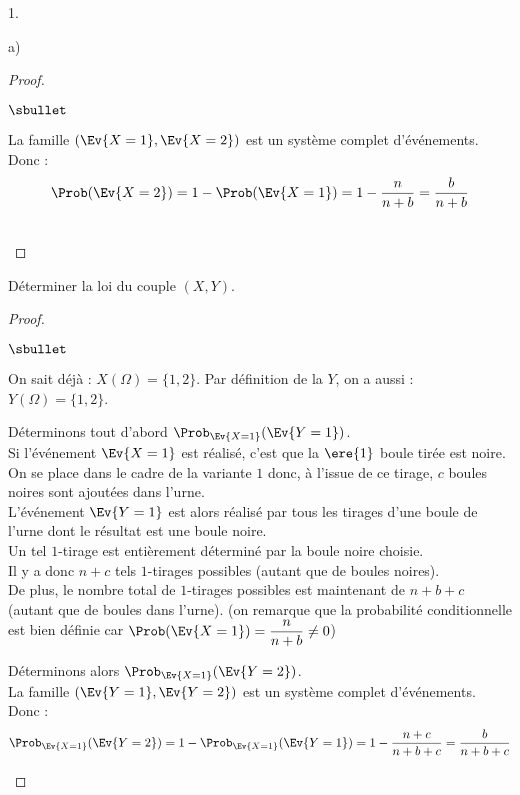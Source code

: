 \documentclass[11pt]{article}%
\begin{document}
\begin{noliste}{1.}
\begin{noliste}{a)}
\begin{proof}
\begin{noliste}{$\sbullet$}
  \item La famille $(\Ev{X=1}, \Ev{X=2})$ est un système complet 
  d'événements. Donc :
  \[
   \Prob(\Ev{X=2})=1-\Prob(\Ev{X=1}) = 1-\dfrac{n}{n+b} =
   \dfrac{b}{n+b}
  \]
 \end{noliste}
 ~\\[-1cm]
\end{proof}



\item Déterminer la loi du couple $(X,Y)$.

\begin{proof}~
  \begin{noliste}{$\sbullet$}
  \item On sait déjà : $X(\Omega)=\{1,2\}$. Par définition de la \var
    $Y$, on a aussi : $Y(\Omega)=\{1,2\}$.
  
  \item Déterminons tout d'abord $\Prob_{\Ev{X=1}}(\Ev{Y = 1})$.\\[.2cm]
    Si l'événement $\Ev{X=1}$ est réalisé, c'est que la $\ere{1}$
    boule tirée est noire. On se place dans le cadre de la variante
    $1$ donc, à l'issue de ce tirage, $c$ boules noires sont ajoutées
    dans l'urne.\\
    L'événement $\Ev{Y=1}$ est alors réalisé par tous les tirages
    d'une boule de l'urne dont le résultat est une boule noire.\\
    Un tel $1$-tirage est entièrement déterminé par la boule noire
    choisie.\\
    Il y a donc $n + c$ tels $1$-tirages possibles (autant que de
    boules noires).\\
    De plus, le nombre total de $1$-tirages possibles est maintenant
    de $n+b+c$ (autant que de boules dans l'urne). %
    (on remarque que la probabilité conditionnelle est bien définie
    car $\Prob(\Ev{X=1})=\dfrac{n}{n+b} \neq 0$)
    
  \item Déterminons alors $\Prob_{\Ev{X=1}}(\Ev{Y = 2})$.\\
    La famille $(\Ev{Y=1}, \Ev{Y=2})$ est un système complet
    d'événements. Donc :
    \[
    \Prob_{\Ev{X=1}}(\Ev{Y=2}) = 1- \Prob_{\Ev{X=1}}(\Ev{Y=1}) = 1-
    \dfrac{n+c}{n+b+c} = \dfrac{b}{n+b+c}
    \]


\end{noliste}
\end{proof}
\end{noliste}
\end{noliste}
\end{document}
